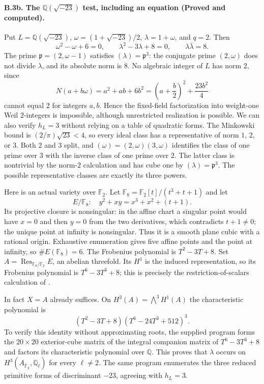 \paragraph{B.3b. The $\mathbb Q(\sqrt{-23})$ test, including an equation
(Proved and computed).}
\label{B3b}
Put $L=\mathbb Q(\sqrt{-23})$, $\omega=(1+\sqrt{-23})/2$,
$\lambda=1+\omega$, and $q=2$. Then
\[
 \omega^2-\omega+6=0,\qquad
 \lambda^2-3\lambda+8=0,\qquad
 \lambda\bar\lambda=8.
\]
The prime $\mathfrak p=(2,\omega-1)$ satisfies
$(\lambda)=\mathfrak p^3$: the conjugate prime $(2,\omega)$ does not
divide $\lambda$, and its absolute norm is $8$. No algebraic integer
of $L$ has norm $2$, since
\[
 N(a+b\omega)=a^2+ab+6b^2
 =\left(a+\frac b2\right)^2+\frac{23b^2}{4}
\]
cannot equal $2$ for integers $a,b$. Hence the fixed-field
factorization into weight-one Weil $2$-integers is impossible, although
unrestricted realization is possible.
We can also verify $h_L=3$ without relying on a table of quadratic
forms. The Minkowski bound is $(2/\pi)\sqrt{23}<4$, so every ideal
class has a representative of norm $1$, $2$, or $3$. Both $2$ and
$3$ split, and $(\omega)=(2,\omega)(3,\omega)$ identifies the
class of one prime over $3$ with the inverse class of one prime
over $2$. The latter class is nontrivial by the norm-$2$
calculation and has cube one by $(\lambda)=\mathfrak p^3$.
The possible representative classes are exactly its three powers.

Here is an actual variety over $\mathbb F_2$. Let
$\mathbb F_8=\mathbb F_2[t]/(t^3+t+1)$ and let
\[
 E/\mathbb F_8:\quad y^2+xy=x^3+x^2+(t+1).
\]
Its projective closure is nonsingular: in the affine chart a singular
point would have $x=0$ and then $y=0$ from the two derivatives, which
contradicts $t+1\ne0$; the unique point at infinity is nonsingular.
Thus it is a smooth plane cubic with a rational origin. Exhaustive
enumeration gives five affine points and the point at infinity, so
$\#E(\mathbb F_8)=6$. The Frobenius polynomial is
$T^2-3T+8$. Set
$A=\operatorname{Res}_{\mathbb F_8/\mathbb F_2}E$, an abelian
threefold. Its $H^1$ is the induced representation, so its Frobenius
polynomial is $T^6-3T^3+8$; this is precisely the
restriction-of-scalars calculation of
\citet[\S3, Lemma~1]{Tate1971}.

In fact $X=A$ already suffices. On $H^3(A)=\bigwedge^3H^1(A)$ the
characteristic polynomial is
\[
 (T^2-3T+8)(T^6-24T^3+512)^3.
\]
To verify this identity without approximating roots, the supplied
program forms the $20\times20$ exterior-cube matrix of the integral
companion matrix of $T^6-3T^3+8$ and factors its characteristic
polynomial over $\mathbb Q$. This proves that $\lambda$ occurs on
$H^3(A_{\overline{\mathbb F}_2},\mathbb Q_\ell)$ for every $\ell\ne2$.
The same program enumerates the three reduced primitive forms of
discriminant $-23$, agreeing with $h_L=3$.

